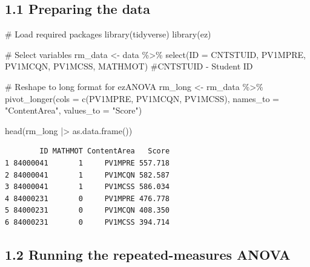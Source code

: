 \documentclass[
  letterpaper,
  DIV=11,
  numbers=noendperiod]{scrreprt}
\newenvironment{Shaded}{\begin{snugshade}}{\end{snugshade}}
\newcommand{\AttributeTok}[1]{\textcolor[rgb]{0.40,0.45,0.13}{#1}}
\newcommand{\CommentTok}[1]{\textcolor[rgb]{0.37,0.37,0.37}{#1}}
\newcommand{\FunctionTok}[1]{\textcolor[rgb]{0.28,0.35,0.67}{#1}}
\newcommand{\NormalTok}[1]{\textcolor[rgb]{0.00,0.23,0.31}{#1}}
\newcommand{\OtherTok}[1]{\textcolor[rgb]{0.00,0.23,0.31}{#1}}
\newcommand{\SpecialCharTok}[1]{\textcolor[rgb]{0.37,0.37,0.37}{#1}}
\newcommand{\StringTok}[1]{\textcolor[rgb]{0.13,0.47,0.30}{#1}}
\begin{document}
\subsection*{1.1 Preparing the data}\label{preparing-the-data}

\begin{Shaded}
\begin{Highlighting}[]
\CommentTok{\# Load required packages }
\FunctionTok{library}\NormalTok{(tidyverse) }
\FunctionTok{library}\NormalTok{(ez) }
 
\CommentTok{\# Select variables }
\NormalTok{rm\_data }\OtherTok{\textless{}{-}}\NormalTok{ data }\SpecialCharTok{\%\textgreater{}\%} 
  \FunctionTok{select}\NormalTok{(}\AttributeTok{ID =}\NormalTok{ CNTSTUID, PV1MPRE, PV1MCQN, PV1MCSS, MATHMOT) }\CommentTok{\#CNTSTUID {-} Student ID }
 
\CommentTok{\# Reshape to long format for ezANOVA }
\NormalTok{rm\_long }\OtherTok{\textless{}{-}}\NormalTok{ rm\_data }\SpecialCharTok{\%\textgreater{}\%} 
  \FunctionTok{pivot\_longer}\NormalTok{(}\AttributeTok{cols =} \FunctionTok{c}\NormalTok{(PV1MPRE, PV1MCQN, PV1MCSS), }
               \AttributeTok{names\_to =} \StringTok{"ContentArea"}\NormalTok{, }
               \AttributeTok{values\_to =} \StringTok{"Score"}\NormalTok{) }
 
\FunctionTok{head}\NormalTok{(rm\_long }\SpecialCharTok{|\textgreater{}} \FunctionTok{as.data.frame}\NormalTok{()) }
\end{Highlighting}
\end{Shaded}

\begin{verbatim}
        ID MATHMOT ContentArea   Score
1 84000041       1     PV1MPRE 557.718
2 84000041       1     PV1MCQN 582.587
3 84000041       1     PV1MCSS 586.034
4 84000231       0     PV1MPRE 476.778
5 84000231       0     PV1MCQN 408.350
6 84000231       0     PV1MCSS 394.714
\end{verbatim}

\subsection*{1.2 Running the repeated-measures
ANOVA}\label{running-the-repeated-measures-anova}
\end{document}
